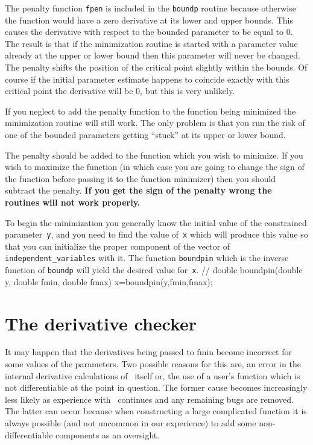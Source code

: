 \documentclass[12pt]{book}
\begin{document}
The penalty function {\tt fpen} is included in the {\tt boundp}
routine because otherwise the function would have a zero 
derivative at its lower and upper bounds. This causes the
derivative with respect to the bounded parameter to 
be equal to 0. The result is that if the minimization routine
is started with a parameter value already at the upper or
lower bound then this parameter will never be changed.
The penalty shifts the position of the  critical point
slightly within the bounds. Of course if the initial parameter
estimate happens to coincide exactly with this critical point the
derivative will be 0, but this is very unlikely.

If you neglect to add the penalty function to the function
being minimized the minimization routine will still work.
The only problem is that you run the risk of one of the
bounded parameters getting ``stuck'' at its upper or lower bound.

The penalty should be added to the function which you wish
to minimize. If you wish to maximize the function (in which case
you are going to change the sign of the function before passing it to
the function minimizer) then you should subtract the penalty.
{\bf If you get the sign of the penalty wrong the routines will not
work properly.}

To begin the minimization you generally know the initial value of the
constrained parameter~{\tt y}, and you need to find the value of~{\tt x}
which will produce this value so that you can initialize the 
proper component of the vector of {\tt independent\_variables}
with it.  The function {\tt boundpin} which is the
inverse function of {\tt boundp} will yield the
desired value for~{\tt x}.  
\beginexample
// double boundpin(double y, double fmin, double fmax)
x=boundpin(y,fmin,fmax);
\endexample

\section{The derivative checker}
It may happen that the derivatives being passed to fmin become incorrect
for some values of the parameters. Two possible reasons for this are,
an error in the internal derivative calculations of \AD\ itself or,
the use of a user's function which is not differentiable at the point  
in question. The former cause becomes increasingly less likely as
experience with \AD\ continues and any remaining bugs are removed. The latter
can occur because when constructing a large complicated function it is always
possible (and not uncommon in our experience) to add some non-differentiable 
components as an oversight.
\end{document}
